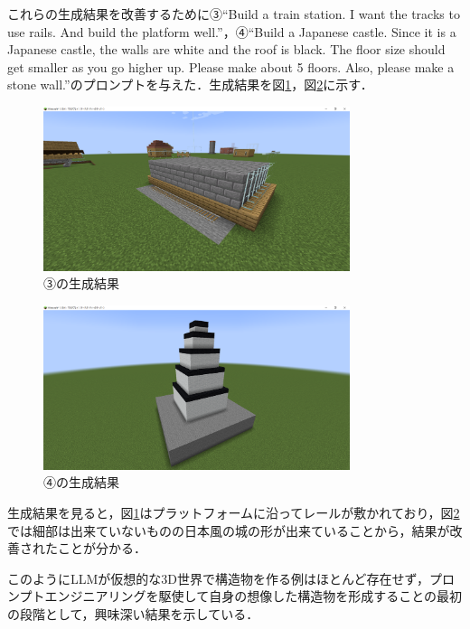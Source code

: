 これらの生成結果を改善するために③``Build a train station. I want the tracks to use rails. And build the platform well.''，④``Build a Japanese castle. Since it is a Japanese castle, the walls are white and the roof is black. The floor size should get smaller as you go higher up. Please make about 5 floors. Also, please make a stone wall.''のプロンプトを与えた．生成結果を図\ref{fig:station2}，図\ref{fig:j_castle2}に示す．

\begin{figure}[H]
    \centering
    \includegraphics[width=0.8\textwidth]{fig/station2.png}
    \caption{③の生成結果}
    \label{fig:station2}
\end{figure}

\begin{figure}[H]
    \centering
    \includegraphics[width=0.8\textwidth]{fig/j_castle2.png}
    \caption{④の生成結果}
    \label{fig:j_castle2}
\end{figure}

生成結果を見ると，図\ref{fig:station2}はプラットフォームに沿ってレールが敷かれており，図\ref{fig:j_castle2}では細部は出来ていないものの日本風の城の形が出来ていることから，結果が改善されたことが分かる．

このようにLLMが仮想的な3D世界で構造物を作る例はほとんど存在せず，プロンプトエンジニアリングを駆使して自身の想像した構造物を形成することの最初の段階として，興味深い結果を示している．

